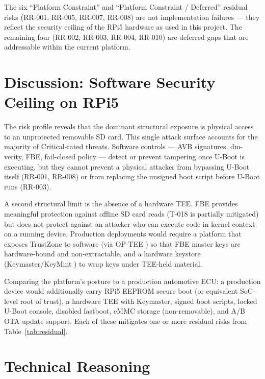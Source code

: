 The six ``Platform Constraint'' and ``Platform Constraint / Deferred'' residual risks (RR-001, RR-005, RR-007, RR-008) are not implementation failures --- they reflect the security ceiling of the RPi5 hardware as used in this project. The remaining four (RR-002, RR-003, RR-004, RR-010) are deferred gaps that are addressable within the current platform.

\section{Discussion: Software Security Ceiling on RPi5}
\label{sec:tara_discussion}

\begin{sloppypar}
The risk profile reveals that the dominant structural exposure is physical access to an unprotected removable SD card. This single attack surface accounts for the majority of Critical-rated threats. Software controls --- AVB signatures, dm-verity, FBE, fail-closed policy --- detect or prevent tampering once U-Boot is executing, but they cannot prevent a physical attacker from bypassing U-Boot itself (RR-001, RR-008) or from replacing the unsigned boot script before U-Boot runs (RR-003).

A second structural limit is the absence of a hardware TEE. FBE provides meaningful protection against offline SD card reads (T-018 is partially mitigated) but does not protect against an attacker who can execute code in kernel context on a running device. Production deployments would require a platform that exposes TrustZone to software (via OP-TEE \cite{optee_project}) so that FBE master keys are hardware-bound and non-extractable, and a hardware keystore (Keymaster/KeyMint \cite{android_keystore_hw}) to wrap keys under TEE-held material.

Comparing the platform's posture to a production automotive ECU: a production device would additionally carry RPi5 EEPROM secure boot (or equivalent SoC-level root of trust), a hardware TEE with Keymaster, signed boot scripts, locked U-Boot console, disabled fastboot, eMMC storage (non-removable), and A/B OTA update support. Each of these mitigates one or more residual risks from Table~\ref{tab:residual}.
\end{sloppypar}

\section{Technical Reasoning}
\label{sec:tara_thesis}

